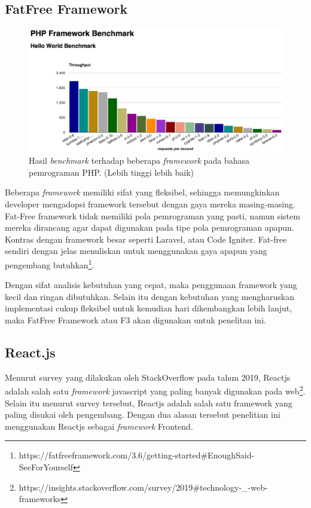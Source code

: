 \subsection{FatFree Framework}

\begin{figure}[H]
    \centering
    \includegraphics[width=0.6\paperwidth]{Gambar/php-framework-benchmark-20170214.png}
    \caption{
        Hasil \textit{benchmark} terhadap beberapa \textit{framework} pada bahasa pemrograman PHP\protect\cite{kenjis:framework-benchmark}. (Lebih tinggi lebih baik)
    }
    \label{fig:chart-benchmark-php-framework}
\end{figure}

Beberapa \textit{framework} memiliki sifat yang fleksibel, sehingga memungkinkan developer mengadopsi framework tersebut dengan gaya mereka masing-masing. Fat-Free framework tidak memiliki pola pemrograman yang pasti, namun sistem mereka dirancang agar dapat digunakan pada tipe pola pemrograman apapun. Kontras dengan framework besar seperti Laravel, atau Code Igniter. Fat-free sendiri dengan jelas menuliskan untuk menggunakan gaya apapun yang pengembang butuhkan\footnote{https://fatfreeframework.com/3.6/getting-started\#EnoughSaid-SeeForYourself}.
 
Dengan sifat analisis kebutuhan yang cepat, maka penggunaan framework yang kecil dan ringan dibutuhkan. Selain itu dengan kebutuhan yang mengharuskan implementasi cukup fleksibel untuk kemudian hari dikembangkan lebih lanjut, maka FatFree Framework atau F3 akan digunakan untuk penelitan ini.

\subsection{React.js}
    Menurut survey yang dilakukan oleh StackOverflow pada tahun 2019, Reactjs adalah salah satu \textit{framework} javascript yang paling banyak digunakan pada web\footnote{https://insights.stackoverflow.com/survey/2019{\#}technology-{\_}-web-frameworks}. Selain itu menurut survey tersebut, Reactjs adalah salah satu framework yang paling disukai oleh pengembang. Dengan dua alasan tersebut penelitian ini menggunakan Reactjs sebagai \textit{framework} Frontend.

